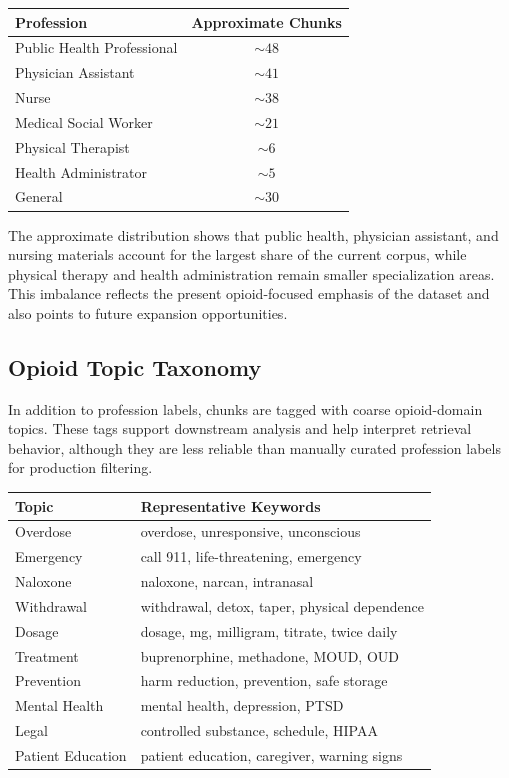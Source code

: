 \documentclass[12pt]{article}
\begin{document}
\begin{center}
\begin{tabular}{>{\raggedright\arraybackslash}p{2.3in} c}
\toprule
\textbf{Profession} & \textbf{Approximate Chunks} \\
\midrule
Public Health Professional & $\sim 48$ \\
Physician Assistant & $\sim 41$ \\
Nurse & $\sim 38$ \\
Medical Social Worker & $\sim 21$ \\
Physical Therapist & $\sim 6$ \\
Health Administrator & $\sim 5$ \\
General & $\sim 30$ \\
\bottomrule
\end{tabular}
\end{center}

The approximate distribution shows that public health, physician assistant, and nursing materials account for the largest share of the current corpus, while physical therapy and health administration remain smaller specialization areas. This imbalance reflects the present opioid-focused emphasis of the dataset and also points to future expansion opportunities.

\subsection{Opioid Topic Taxonomy}

In addition to profession labels, chunks are tagged with coarse opioid-domain topics. These tags support downstream analysis and help interpret retrieval behavior, although they are less reliable than manually curated profession labels for production filtering.

\begin{center}
\small
\begin{tabular}{>{\raggedright\arraybackslash}p{1.45in} >{\raggedright\arraybackslash}p{4.3in}}
\toprule
\textbf{Topic} & \textbf{Representative Keywords} \\
\midrule
Overdose & overdose, unresponsive, unconscious \\
Emergency & call 911, life-threatening, emergency \\
Naloxone & naloxone, narcan, intranasal \\
Withdrawal & withdrawal, detox, taper, physical dependence \\
Dosage & dosage, mg, milligram, titrate, twice daily \\
Treatment & buprenorphine, methadone, MOUD, OUD \\
Prevention & harm reduction, prevention, safe storage \\
Mental Health & mental health, depression, PTSD \\
Legal & controlled substance, schedule, HIPAA \\
Patient Education & patient education, caregiver, warning signs \\
\bottomrule
\end{tabular}
\end{center}
\end{document}
